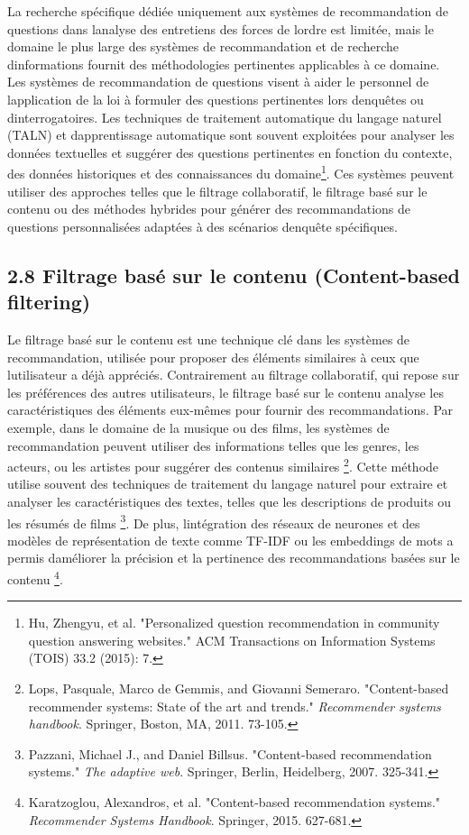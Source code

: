 \documentclass[
]{article}
\begin{document}
La recherche spécifique dédiée uniquement aux systèmes de recommandation
de questions dans l\textquotesingle analyse des entretiens des forces de
l\textquotesingle ordre est limitée, mais le domaine le plus large des
systèmes de recommandation et de recherche
d\textquotesingle informations fournit des méthodologies pertinentes
applicables à ce domaine. Les systèmes de recommandation de questions
visent à aider le personnel de l\textquotesingle application de la loi à
formuler des questions pertinentes lors d\textquotesingle enquêtes ou
d\textquotesingle interrogatoires. Les techniques de traitement
automatique du langage naturel (TALN) et d\textquotesingle apprentissage
automatique sont souvent exploitées pour analyser les données textuelles
et suggérer des questions pertinentes en fonction du contexte, des
données historiques et des connaissances du domaine\footnote{Hu,
  Zhengyu, et al. "Personalized question recommendation in community
  question answering websites." ACM Transactions on Information Systems
  (TOIS) 33.2 (2015): 7.}. Ces systèmes peuvent utiliser des approches
telles que le filtrage collaboratif, le filtrage basé sur le contenu ou
des méthodes hybrides pour générer des recommandations de questions
personnalisées adaptées à des scénarios d\textquotesingle enquête
spécifiques.

\subsection{2.8 Filtrage basé sur le contenu (Content-based
filtering)}\label{filtrage-basuxe9-sur-le-contenu-content-based-filtering}

Le filtrage basé sur le contenu est une technique clé dans les systèmes
de recommandation, utilisée pour proposer des éléments similaires à ceux
que l\textquotesingle utilisateur a déjà appréciés. Contrairement au
filtrage collaboratif, qui repose sur les préférences des autres
utilisateurs, le filtrage basé sur le contenu analyse les
caractéristiques des éléments eux-mêmes pour fournir des
recommandations. Par exemple, dans le domaine de la musique ou des
films, les systèmes de recommandation peuvent utiliser des informations
telles que les genres, les acteurs, ou les artistes pour suggérer des
contenus similaires \footnote{Lops, Pasquale, Marco de Gemmis, and
  Giovanni Semeraro. "Content-based recommender systems: State of the
  art and trends." \emph{Recommender systems handbook}. Springer,
  Boston, MA, 2011. 73-105.}. Cette méthode utilise souvent des
techniques de traitement du langage naturel pour extraire et analyser
les caractéristiques des textes, telles que les descriptions de produits
ou les résumés de films \footnote{Pazzani, Michael J., and Daniel
  Billsus. "Content-based recommendation systems." \emph{The adaptive
  web}. Springer, Berlin, Heidelberg, 2007. 325-341.}. De plus,
l\textquotesingle intégration des réseaux de neurones et des modèles de
représentation de texte comme TF-IDF ou les embeddings de mots a permis
d\textquotesingle améliorer la précision et la pertinence des
recommandations basées sur le contenu \footnote{Karatzoglou, Alexandros,
  et al. "Content-based recommendation systems." \emph{Recommender
  Systems Handbook}. Springer, 2015. 627-681.}.
\end{document}

